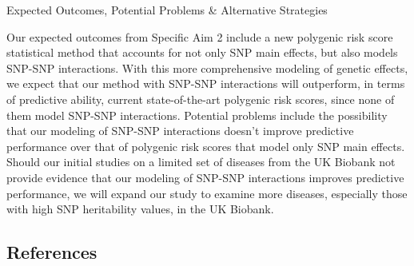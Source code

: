 \documentclass[
  11pt,
  letterpaper,
  DIV=11,
  numbers=noendperiod]{scrartcl}
\begin{document}
Expected Outcomes, Potential Problems \& Alternative Strategies

Our expected outcomes from Specific Aim 2 include a new polygenic risk
score statistical method that accounts for not only SNP main effects,
but also models SNP-SNP interactions. With this more comprehensive
modeling of genetic effects, we expect that our method with SNP-SNP
interactions will outperform, in terms of predictive ability, current
state-of-the-art polygenic risk scores, since none of them model SNP-SNP
interactions. Potential problems include the possibility that our
modeling of SNP-SNP interactions doesn't improve predictive performance
over that of polygenic risk scores that model only SNP main effects.
Should our initial studies on a limited set of diseases from the UK
Biobank not provide evidence that our modeling of SNP-SNP interactions
improves predictive performance, we will expand our study to examine
more diseases, especially those with high SNP heritability values, in
the UK Biobank.

\hypertarget{references}{%
\subsection*{References}\label{references}}
\end{document}
